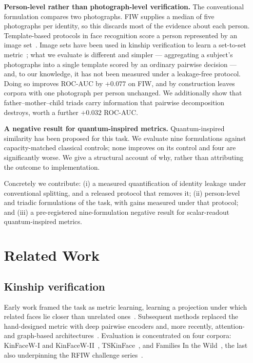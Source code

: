 \documentclass[preprint,12pt]{elsarticle}
\begin{document}
\textbf{Person-level rather than photograph-level verification.} The
conventional formulation compares two photographs. FIW supplies a median of
five photographs per identity, so this discards most of the evidence about each
person. Template-based protocols in face recognition score a person represented
by an image set~\cite{whitelam2017ijbb}. Image sets have been used in kinship
verification to learn a set-to-set metric~\cite{kohli2019imageset}; what we
evaluate is different and simpler --- aggregating a subject's photographs into
a single template scored by an ordinary pairwise decision --- and, to our
knowledge, it has not been measured under a leakage-free protocol. Doing so
improves ROC-AUC by $+0.077$ on FIW, and by construction leaves corpora with
one photograph per person unchanged.
We additionally show that father--mother--child triads carry information that
pairwise decomposition destroys, worth a further $+0.032$ ROC-AUC.

\textbf{A negative result for quantum-inspired metrics.} Quantum-inspired
similarity has been proposed for this task. We evaluate nine formulations
against capacity-matched classical controls; none improves on its control and
four are significantly worse. We give a structural account of why, rather than
attributing the outcome to implementation.

Concretely we contribute: (i) a measured quantification of identity leakage
under conventional splitting, and a released protocol that removes it;
(ii) person-level and triadic formulations of the task, with gains measured
under that protocol; and (iii) a pre-registered nine-formulation negative
result for scalar-readout quantum-inspired metrics.

\section{Related Work}

\subsection{Kinship verification}

Early work framed the task as metric learning, learning a projection under
which related faces lie closer than unrelated ones~\cite{lu2014neighborhood}.
Subsequent methods replaced the hand-designed metric with deep pairwise
encoders and, more recently, attention- and graph-based
architectures~\cite{zhu2022kinship}. Evaluation is concentrated on four
corpora: KinFaceW-I and KinFaceW-II~\cite{lu2012kinfacew},
TSKinFace~\cite{qin2015tri}, and Families In the Wild~\cite{robinson2018fiw},
the last also underpinning the RFIW challenge series~\cite{robinson2020rfiw}.
\end{document}
